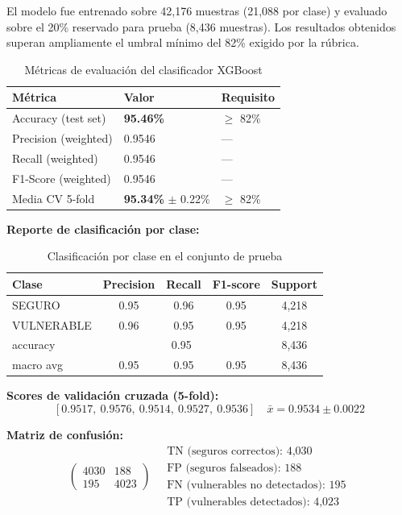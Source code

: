 \documentclass[12pt,a4paper]{article}
\begin{document}
El modelo fue entrenado sobre 42,176 muestras (21,088 por clase) y evaluado sobre el 20\% reservado para prueba (8,436 muestras). Los resultados obtenidos superan ampliamente el umbral mínimo del 82\% exigido por la rúbrica.

\begin{table}[H]
\centering
\begin{tabular}{@{}lll@{}}
\toprule
\textbf{Métrica} & \textbf{Valor} & \textbf{Requisito} \\
\midrule
Accuracy (test set)         & \textbf{95.46\%} & $\geq$ 82\% \\
Precision (weighted)        & 0.9546           & ---          \\
Recall (weighted)           & 0.9546           & ---          \\
F1-Score (weighted)         & 0.9546           & ---          \\
Media CV 5-fold             & \textbf{95.34\%} $\pm$ 0.22\% & $\geq$ 82\% \\
\bottomrule
\end{tabular}
\caption{Métricas de evaluación del clasificador XGBoost}
\end{table}

\textbf{Reporte de clasificación por clase:}

\begin{table}[H]
\centering
\begin{tabular}{@{}lcccc@{}}
\toprule
\textbf{Clase} & \textbf{Precision} & \textbf{Recall} & \textbf{F1-score} & \textbf{Support} \\
\midrule
SEGURO     & 0.95 & 0.96 & 0.95 & 4,218 \\
VULNERABLE & 0.96 & 0.95 & 0.95 & 4,218 \\
\midrule
accuracy   & \multicolumn{3}{c}{0.95} & 8,436 \\
macro avg  & 0.95 & 0.95 & 0.95 & 8,436 \\
\bottomrule
\end{tabular}
\caption{Clasificación por clase en el conjunto de prueba}
\end{table}

\textbf{Scores de validación cruzada (5-fold):}
\[
[0.9517,\ 0.9576,\ 0.9514,\ 0.9527,\ 0.9536] \quad \bar{x} = 0.9534 \pm 0.0022
\]

\textbf{Matriz de confusión:}
\[
\begin{pmatrix}
4030 & 188 \\
195  & 4023
\end{pmatrix}
\quad
\begin{array}{l}
\text{TN (seguros correctos): 4,030} \\
\text{FP (seguros falseados): 188} \\
\text{FN (vulnerables no detectados): 195} \\
\text{TP (vulnerables detectados): 4,023}
\end{array}
\]
\end{document}
